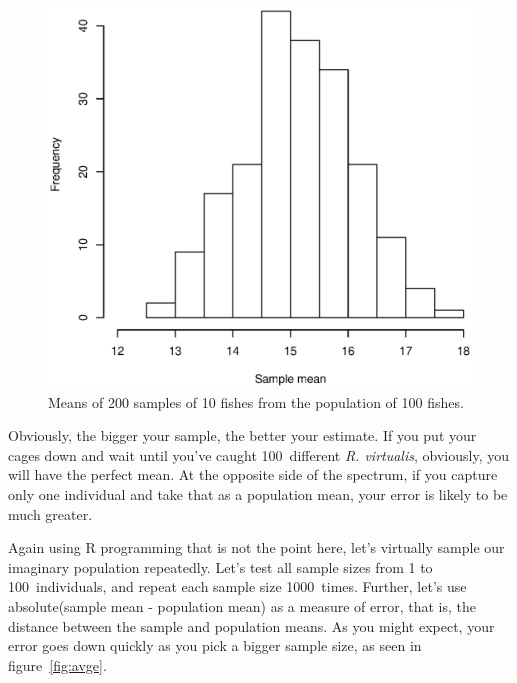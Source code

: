 \documentclass{report}
\newcommand{\code}[1]{\textsf{\ttfamily #1}}
\newcommand{\species}[1]{\textit{#1}}
\begin{document}
			\begin{figure}[h]
				\centering
				\includegraphics[width=1.0\textwidth]{mean_distribution.eps}
				\caption{Means of 200 samples of 10 fishes from the population of 100 fishes.}
				\label{fig:md}
			\end{figure}
			
			Obviously, the bigger your sample, the better your estimate. If you put your cages down and wait until you've caught 100~different \species{R. virtualis}, obviously, you will have the perfect mean. At the opposite side of the spectrum, if you capture only one individual and take that as a population mean, your error is likely to be much greater.
			
			Again using R programming that is not the point here, let's virtually sample our imaginary population repeatedly. Let's test all sample sizes from 1 to 100~individuals, and repeat each sample size 1000~times. Further, let's use \code{absolute(sample mean - population mean)} as a measure of error, that is, the distance between the sample and population means. As you might expect, your error goes down quickly as you pick a bigger sample size, as seen in figure~\ref{fig:avge}.
			
\end{document}
